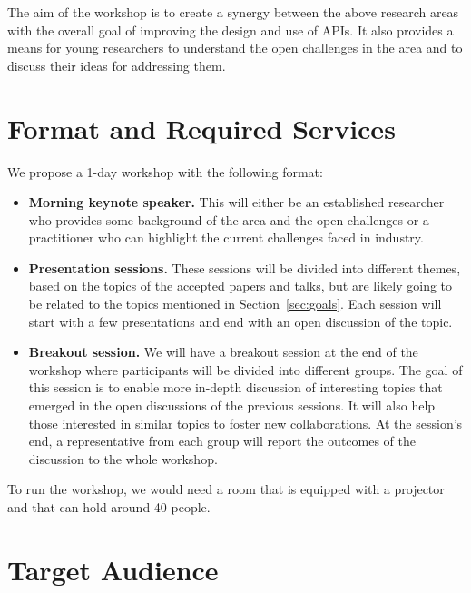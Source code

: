 \documentclass[10pt, conference]{IEEEtran}
\begin{document}
The aim of the workshop is to create a synergy between the above research areas with the overall goal of improving the design and use of APIs. It also provides a means for young researchers to understand the open challenges in the area and to discuss their ideas for addressing them.

\section{Format and Required Services}

We propose a 1-day workshop with the following format:

\begin{itemize}
\item \textbf{Morning keynote speaker.} This will either be an established researcher who provides some background of the area and the open challenges or a practitioner who can highlight the current challenges faced in industry.
\item \textbf{Presentation sessions.} These sessions will be divided into different themes, based on the topics of the accepted papers and talks, but are likely going to be related to the topics mentioned in Section~\ref{sec:goals}. Each session will start with a few presentations and end with an open discussion of the topic. 
\item \textbf{Breakout session.} We will have a breakout session at the end of the workshop where participants will be divided into different groups. The goal of this session is to enable more in-depth discussion of interesting topics that emerged in the open discussions of the previous sessions. It will also help those interested in similar topics to foster new collaborations. At the session's end, a representative from each group will report the outcomes of the discussion to the whole workshop.
\end{itemize}

To run the workshop, we would need a room that is equipped with a projector and that can hold around 40 people.

\section{Target Audience}
\end{document}

